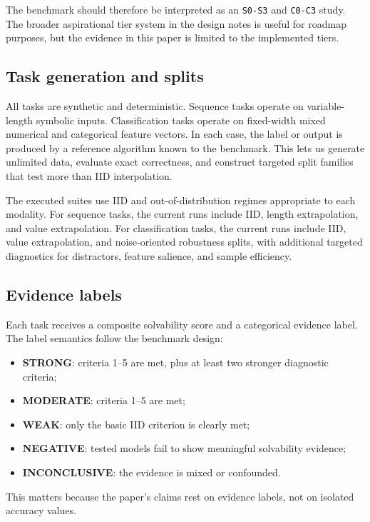 \documentclass[11pt]{article}
\begin{document}
The benchmark should therefore be interpreted as an \texttt{S0-S3} and \texttt{C0-C3} study. The broader aspirational tier system in the design notes is useful for roadmap purposes, but the evidence in this paper is limited to the implemented tiers.

\subsection{Task generation and splits}

All tasks are synthetic and deterministic. Sequence tasks operate on variable-length symbolic inputs. Classification tasks operate on fixed-width mixed numerical and categorical feature vectors. In each case, the label or output is produced by a reference algorithm known to the benchmark. This lets us generate unlimited data, evaluate exact correctness, and construct targeted split families that test more than IID interpolation.

The executed suites use IID and out-of-distribution regimes appropriate to each modality. For sequence tasks, the current runs include IID, length extrapolation, and value extrapolation. For classification tasks, the current runs include IID, value extrapolation, and noise-oriented robustness splits, with additional targeted diagnostics for distractors, feature salience, and sample efficiency.

\subsection{Evidence labels}

Each task receives a composite solvability score and a categorical evidence label. The label semantics follow the benchmark design:

\begin{itemize}
  \item \textbf{STRONG}: criteria 1--5 are met, plus at least two stronger diagnostic criteria;
  \item \textbf{MODERATE}: criteria 1--5 are met;
  \item \textbf{WEAK}: only the basic IID criterion is clearly met;
  \item \textbf{NEGATIVE}: tested models fail to show meaningful solvability evidence;
  \item \textbf{INCONCLUSIVE}: the evidence is mixed or confounded.
\end{itemize}

This matters because the paper's claims rest on evidence labels, not on isolated accuracy values.
\end{document}
